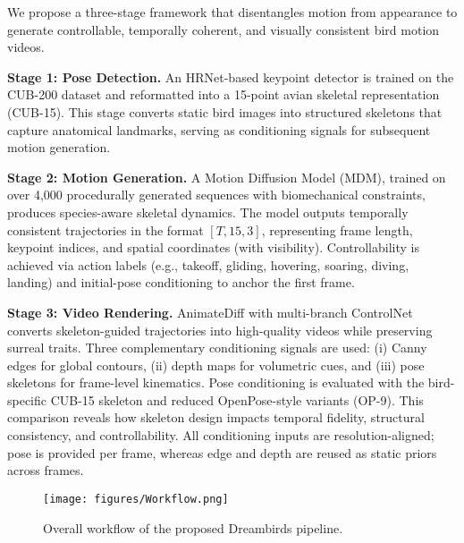 \documentclass[final-report]{report-template}
\begin{document}


We propose a three-stage framework that disentangles motion from appearance to generate controllable, temporally coherent, and visually consistent bird motion videos. 

\textbf{Stage 1: Pose Detection.} An HRNet-based keypoint detector is trained on the CUB-200 dataset and reformatted into a 15-point avian skeletal representation (CUB-15). This stage converts static bird images into structured skeletons that capture anatomical landmarks, serving as conditioning signals for subsequent motion generation.  

\textbf{Stage 2: Motion Generation.} A Motion Diffusion Model (MDM), trained on over 4,000 procedurally generated sequences with biomechanical constraints, produces species-aware skeletal dynamics. The model outputs temporally consistent trajectories in the format $[T, 15, 3]$, representing frame length, keypoint indices, and spatial coordinates (with visibility). Controllability is achieved via action labels (e.g., takeoff, gliding, hovering, soaring, diving, landing) and initial-pose conditioning to anchor the first frame.  

\textbf{Stage 3: Video Rendering.} AnimateDiff with multi-branch ControlNet converts skeleton-guided trajectories into high-quality videos while preserving surreal traits. Three complementary conditioning signals are used: (i) Canny edges for global contours, (ii) depth maps for volumetric cues, and (iii) pose skeletons for frame-level kinematics. Pose conditioning is evaluated with the bird-specific CUB-15 skeleton and reduced OpenPose-style variants (OP-9). This comparison reveals how skeleton design impacts temporal fidelity, structural consistency, and controllability. All conditioning inputs are resolution-aligned; pose is provided per frame, whereas edge and depth are reused as static priors across frames.  


\begin{figure}[h]
    \centering
    \texttt{[image: figures/Workflow.png]}
    \caption{Overall workflow of the proposed Dreambirds pipeline.}
    \label{fig:workflow}
\end{figure}


\end{document}
